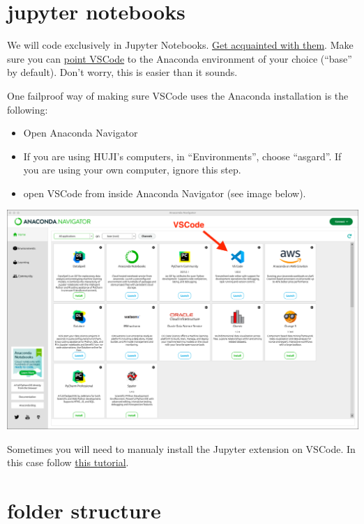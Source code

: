 \documentclass[
  letterpaper,
  DIV=11,
  numbers=noendperiod,
  oneside]{scrreprt}
\providecommand{\tightlist}{%
  \setlength{\itemsep}{0pt}\setlength{\parskip}{0pt}}\usepackage{longtable,booktabs,array}
\begin{document}
\hypertarget{jupyter-notebooks}{%
\section{jupyter notebooks}\label{jupyter-notebooks}}

We will code exclusively in Jupyter Notebooks.
\href{https://code.visualstudio.com/docs/datascience/jupyter-notebooks}{Get
acquainted with them}. Make sure you can
\href{https://opensourceoptions.com/blog/setup-anaconda-python-to-work-with-visual-studio-code-on-windows/}{point
VSCode} to the Anaconda environment of your choice (``base'' by
default). Don't worry, this is easier than it sounds.

One failproof way of making sure VSCode uses the Anaconda installation
is the following:

\begin{itemize}
\tightlist
\item
  Open Anaconda Navigator
\item
  If you are using HUJI's computers, in ``Environments'', choose
  ``asgard''. If you are using your own computer, ignore this step.
\item
  open VSCode from inside Anaconda Navigator (see image below).
\end{itemize}

\includegraphics{basics/anaconda-navigator.png}

Sometimes you will need to manualy install the Jupyter extension on
VSCode. In this case follow
\href{https://code.visualstudio.com/docs/datascience/jupyter-notebooks}{this
tutorial}.

\hypertarget{folder-structure}{%
\section{folder structure}\label{folder-structure}}
\end{document}
